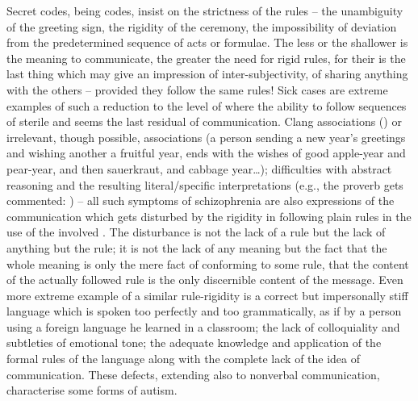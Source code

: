 Secret codes, being codes, insist on the strictness of the rules -- the
unambiguity of the greeting sign, the rigidity of the ceremony, the
impossibility of deviation from the predetermined sequence of acts or
formulae. The less or the shallower is
the meaning to communicate, the greater the need for rigid rules, for their
 is the last thing which may give an impression of
inter-subjectivity, of sharing anything with the others -- provided they follow
the same rules!  Sick cases are extreme examples of such a reduction to the
level of  where the ability to follow sequences of sterile
and  seems the last residual of communication.  Clang
associations () or irrelevant, though possible,
associations (a person sending a new year's greetings and wishing another a
fruitful year, ends with the wishes of good apple-year and pear-year, and then
sauerkraut, and cabbage year\ldots); difficulties with abstract reasoning and
the resulting literal/specific interpretations (e.g., the proverb  gets commented: ) -- all such symptoms
of schizophrenia are also expressions of the communication which gets disturbed
by the rigidity in following plain rules in the use of the involved
.  The disturbance is not the lack of a rule but
the lack of anything but the rule; it is not the lack of any meaning but the
fact that the whole meaning is only the mere fact of conforming to some rule,
that the content of the actually followed rule is the only discernible content
of the message.  Even more extreme example of a similar rule-rigidity is a
correct but impersonally stiff language which is spoken too perfectly and too
grammatically, as if by a person using a foreign language he learned in a
classroom; the lack of colloquiality and subtleties of emotional tone; the
adequate knowledge and application of the formal rules of the language along
with the complete lack of the idea of communication. These defects, extending
also to nonverbal communication, characterise some forms of autism.

